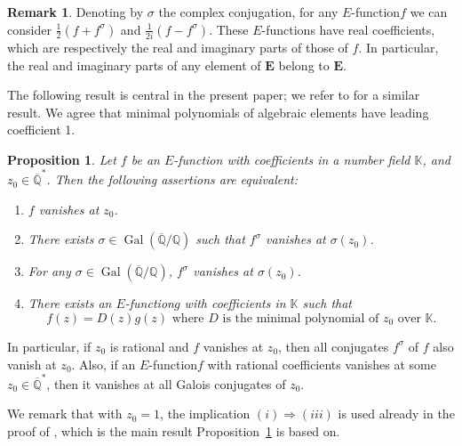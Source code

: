 \documentclass[11pt]{article}
\numberwithin{equation}{section}
\newenvironment{enumeratei}
{\bgroup\def\theenumi{\roman{enumi}}\def\theenumii{\arabic{enumii}}\begin{enumerate}}
{\end{enumerate}\egroup}
\newcommand{\Efunction}{$E$\nobreakdash-func\-tion\xspace}
\newcommand{\Efunctions}{$E$\nobreakdash-func\-tions\xspace}
\newtheorem{prop}{Proposition}
\theoremstyle{definition}
\newtheorem*{Remark*}{Remark}
\newcommand{\Q}{\mathbb{Q}}
\newcommand{\K}{\mathbb{K}}
\newcommand{\EE}{{\mathbf E}}
\newcommand{\Qbar}{\overline{\mathbb Q}}
\DeclareMathOperator{\Gal}{Gal}
\begin{document}
\begin{Remark*}
Denoting by $\sigma $ the complex conjugation, for any \Efunction $f$ we can consider $\frac12(f+f^\sigma)$ and $\frac1{2i} (f-f^\sigma)$. These \Efunctions have real coefficients, which are respectively the real and imaginary parts of those of $f$. In particular, the real and imaginary parts of any element of $\EE$ belong to $\EE$.\end{Remark*}

The following result is central in the present paper; we refer to \cite[Prop.\,3.5]{BRS2} for a similar result. We agree that minimal polynomials of algebraic elements have leading coefficient 1.

\begin{prop}\label{prop1} Let $f$ be an \Efunction with coefficients in a number field $\K$, and $z_0\in \Qbar^\ast$. Then the following assertions are equivalent:
\begin{enumeratei}
\item\label{prop1i}
$f$ vanishes at $ z_0 $.
\item\label{prop1ii}
There exists $\sigma \in\Gal(\Qbar/\Q)$ such that $f^\sigma $ vanishes at $ \sigma(z_0) $.
\item\label{prop1iii}
For any $\sigma \in\Gal(\Qbar/\Q)$, $f^\sigma $ vanishes at $ \sigma(z_0) $.
\item\label{prop1iv}
There exists an \Efunction $g$ with coefficients in $\K$ such that
\[
f(z) = D(z) g(z) \mbox{ where $D$ is the minimal polynomial of $z_0$ over $\K$.}
\]
\end{enumeratei}
\end{prop}

In particular, if $z_0$ is rational and $f$ vanishes at $z_0$, then all conjugates $f^\sigma$ of $f$ also vanish at $z_0$.
Also, if an \Efunction $f$ with rational coefficients vanishes at some $z_0\in \Qbar^\ast$, then it vanishes at all Galois conjugates of $z_0$.

We remark that with $z_0=1$, the implication $(i)\Rightarrow (iii)$ is used already in the proof of \cite[Prop.\,4.1]{beukers}, which is the main result Proposition~\ref{prop1} is based on.
\end{document}

